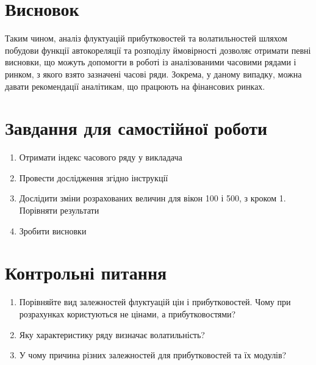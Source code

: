 \documentclass[
  letterpaper,
]{report}
\providecommand{\tightlist}{%
  \setlength{\itemsep}{0pt}\setlength{\parskip}{0pt}}\usepackage{longtable,booktabs,array}
\begin{document}
\hypertarget{ux432ux438ux441ux43dux43eux432ux43eux43a}{%
\section{Висновок}\label{ux432ux438ux441ux43dux43eux432ux43eux43a}}

Таким чином, аналіз флуктуацій прибутковостей та волатильностей шляхом
побудови функції автокореляції та розподілу ймовірності дозволяє
отримати певні висновки, що можуть допомогти в роботі із аналізованими
часовими рядами і ринком, з якого взято зазначені часові ряди. Зокрема,
у даному випадку, можна давати рекомендації аналітикам, що працюють на
фінансових ринках.

\hypertarget{ux437ux430ux432ux434ux430ux43dux43dux44f-ux434ux43bux44f-ux441ux430ux43cux43eux441ux442ux456ux439ux43dux43eux457-ux440ux43eux431ux43eux442ux438}{%
\section{Завдання для самостійної
роботи}\label{ux437ux430ux432ux434ux430ux43dux43dux44f-ux434ux43bux44f-ux441ux430ux43cux43eux441ux442ux456ux439ux43dux43eux457-ux440ux43eux431ux43eux442ux438}}

\begin{enumerate}
\def\labelenumi{\arabic{enumi}.}
\tightlist
\item
  Отримати індекс часового ряду у викладача
\item
  Провести дослідження згідно інструкції
\item
  Дослідити зміни розрахованих величин для вікон 100 і 500, з кроком 1.
  Порівняти результати
\item
  Зробити висновки
\end{enumerate}

\hypertarget{ux43aux43eux43dux442ux440ux43eux43bux44cux43dux456-ux43fux438ux442ux430ux43dux43dux44f}{%
\section{Контрольні
питання}\label{ux43aux43eux43dux442ux440ux43eux43bux44cux43dux456-ux43fux438ux442ux430ux43dux43dux44f}}

\begin{enumerate}
\def\labelenumi{\arabic{enumi}.}
\tightlist
\item
  Порівняйте вид залежностей флуктуацій цін і прибутковостей. Чому при
  розрахунках користуються не цінами, а прибутковостями?
\item
  Яку характеристику ряду визначає волатильність?
\item
  У чому причина різних залежностей для прибутковостей та їх модулів?
\end{enumerate}
\end{document}
